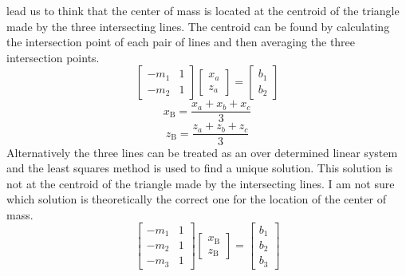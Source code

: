 \documentclass{bmd2010p}
\begin{document}
lead us to think that the center of mass is located at the centroid of the
triangle made by the three intersecting lines. The centroid can be found by
calculating the intersection point of each pair of lines and then averaging the
three intersection points.
\begin{equation}
	\left[
	\begin{array}{cc}
		-m_1 & 1\\
		-m_2 & 1
	\end{array}
	\right]
	\left[
	\begin{array}{c}
		x_a\\
		z_a
	\end{array}
	\right]
	=
	\left[
	\begin{array}{c}
		b_1\\
		b_2
	\end{array}
	\right]
\label{eq:linearSystem}
\end{equation}
\begin{equation}
    x_\mathrm{B} = \frac{x_a + x_b + x_c}{3}
\end{equation}
\begin{equation}
    z_\mathrm{B} = \frac{z_a + z_b + z_c}{3}
\end{equation}
Alternatively the three lines can be treated as an over determined linear
system and the least squares method is used to find a unique solution. This
solution is not at the centroid of the triangle made by the intersecting lines.
I am not sure which solution is theoretically the correct one for the location
of the center of mass.
\begin{equation}
	\left[
	\begin{array}{cc}
		-m_1 & 1\\
		-m_2 & 1\\
		-m_3 & 1
	\end{array}
	\right]
	\left[
	\begin{array}{c}
        x_\mathrm{B}\\
        z_\mathrm{B}
	\end{array}
	\right]
	=
	\left[
	\begin{array}{c}
		b_1\\
		b_2\\
		b_3
	\end{array}
	\right]	
\label{eq:leastSquares}
\end{equation}
\end{document}
